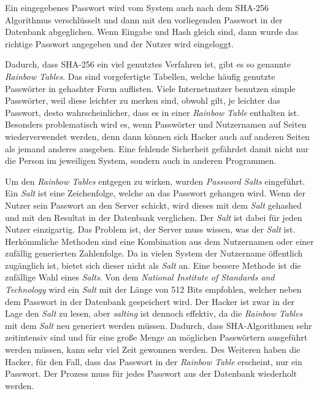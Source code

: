 Ein eingegebenes Passwort wird vom System auch nach dem SHA-256 Algorithmus verschlüsselt und dann mit den vorliegenden Passwort in der Datenbank abgeglichen. Wenn Eingabe und Hash gleich sind, dann wurde das richtige Passwort angegeben und der Nutzer wird eingeloggt.

Dadurch, dass SHA-256 ein viel genutztes Verfahren ist, gibt es so genannte \textit{Rainbow Tables}. Das sind vorgefertigte Tabellen, welche häufig genutzte Passwörter in gehashter Form auflisten. Viele Internetnutzer benutzen simple Passwörter, weil diese leichter zu merken sind, obwohl gilt, je leichter das Passwort, desto wahrscheinlicher, dass es in einer \textit{Rainbow Table} enthalten ist. Besonders problematisch wird es, wenn Passwörter und Nutzernamen auf Seiten wiederverwendet werden, denn dann können sich Hacker auch auf anderen Seiten als jemand anderes ausgeben. Eine fehlende Sicherheit gefährdet damit nicht nur die Person im jeweiligen System, sondern auch in anderen Programmen.

Um den \textit{Rainbow Tables} entgegen zu wirken, wurden \textit{Password Salts} eingeführt. Ein \textit{Salt} ist eine Zeichenfolge, welche an das Passwort gehangen wird. Wenn der Nutzer sein Passwort an den Server schickt, wird dieses mit dem \textit{Salt} gehashed und mit den Resultat in der Datenbank verglichen. Der \textit{Salt} ist dabei für jeden Nutzer einzigartig. Das Problem ist, der Server muss wissen, was der \textit{Salt} ist. Herkömmliche Methoden sind eine Kombination aus dem Nutzernamen oder einer zufällig generierten Zahlenfolge. Da in vielen System der Nutzername öffentlich zugänglich ist, bietet sich dieser nicht als \textit{Salt} an. Eine bessere Methode ist die zufällige Wahl eines \textit{Salts}. Von dem \textit{National Institute of Standards and Technology}
wird ein \textit{Salt} mit der Länge von 512 Bits empfohlen, welcher neben dem Passwort in der Datenbank gespeichert wird. Der Hacker ist zwar in der Lage den \textit{Salt} zu lesen, aber \textit{salting} ist dennoch effektiv, da die \textit{Rainbow Tables} mit dem \textit{Salt} neu generiert werden müssen. Dadurch, dass SHA-Algorithmen sehr zeitintensiv sind und für eine große Menge an möglichen Passwörtern ausgeführt werden müssen, kann sehr viel Zeit gewonnen werden. Des Weiteren haben die Hacker, für den Fall, dass das Passwort in der \textit{Rainbow Table} erscheint, nur ein Passwort. Der Prozess muss für jedes Passwort aus der Datenbank wiederholt werden.

